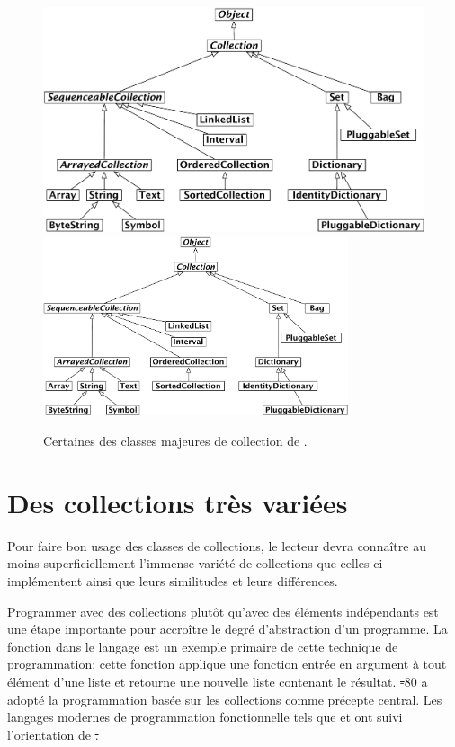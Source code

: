 \documentclass[a4paper,10pt,twoside]{book}
\begin{document}
\begin{figure}
\begin{center}
\ifluluelse
	{\includegraphics[width=\textwidth]{CollectionHierarchy}}
	{\includegraphics[width=0.8\textwidth]{CollectionHierarchy}}
\caption{Certaines des classes majeures de collection de \pharo.}
\end{center}
\end{figure}

\section{Des collections très variées}

Pour faire bon usage des classes de collections, le lecteur devra connaître
au moins superficiellement l'immense variété de collections que celles-ci
implémentent ainsi que leurs similitudes et leurs différences.

Programmer avec des collections plutôt qu'avec des éléments 
indépendants est une étape importante pour accroître le degré
d'abstraction d'un programme.
La fonction  dans le langage  est un exemple
primaire de cette technique de programmation: cette fonction
applique une fonction entrée en argument à tout élément d'une
liste et retourne une nouvelle liste contenant le résultat.
\st-80 a adopté la programmation basée sur les collections
comme précepte central.
Les langages modernes de programmation fonctionnelle tels que 
et  ont suivi l'orientation de \st. 
\end{document}
